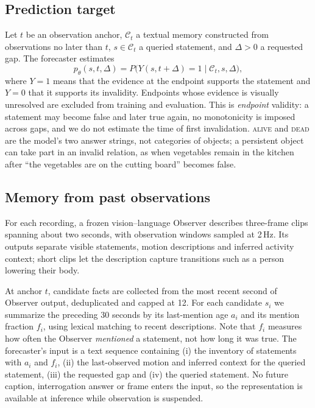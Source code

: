 \documentclass[10pt]{article}
\newcommand{\alive}{\textsc{alive}}
\newcommand{\dead}{\textsc{dead}}
\begin{document}
\subsection{Prediction target}
Let $t$ be an observation anchor, $\mathcal{C}_t$ a textual memory constructed from observations no later than $t$, $s \in \mathcal{C}_t$ a queried statement, and $\Delta > 0$ a requested gap. The forecaster estimates
\begin{equation}
p_\theta(s,t,\Delta) = P\big(Y(s,t+\Delta)=1 \mid \mathcal{C}_t, s, \Delta\big),
\label{eq:target}
\end{equation}
where $Y=1$ means that the evidence at the endpoint supports the statement and $Y=0$ that it supports its invalidity. Endpoints whose evidence is visually unresolved are excluded from training and evaluation. This is \emph{endpoint} validity: a statement may become false and later true again, no monotonicity is imposed across gaps, and we do not estimate the time of first invalidation. \alive{} and \dead{} are the model's two answer strings, not categories of objects; a persistent object can take part in an invalid relation, as when vegetables remain in the kitchen after ``the vegetables are on the cutting board'' becomes false.

\subsection{Memory from past observations}
For each recording, a frozen vision--language Observer describes three-frame clips spanning about two seconds, with observation windows sampled at 2\,Hz. Its outputs separate visible statements, motion descriptions and inferred activity context; short clips let the description capture transitions such as a person lowering their body.

At anchor $t$, candidate facts are collected from the most recent second of Observer output, deduplicated and capped at 12. For each candidate $s_i$ we summarize the preceding 30 seconds by its last-mention age $a_i$ and its mention fraction $f_i$, using lexical matching to recent descriptions. Note that $f_i$ measures how often the Observer \emph{mentioned} a statement, not how long it was true. The forecaster's input is a text sequence containing (i) the inventory of statements with $a_i$ and $f_i$, (ii) the last-observed motion and inferred context for the queried statement, (iii) the requested gap and (iv) the queried statement. No future caption, interrogation answer or frame enters the input, so the representation is available at inference while observation is suspended.
\end{document}
